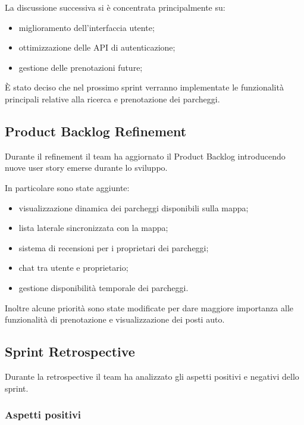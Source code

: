 \documentclass[12pt,a4paper]{article}
\begin{document}
La discussione successiva si è concentrata principalmente su:

\begin{itemize}
    \item miglioramento dell'interfaccia utente;
    \item ottimizzazione delle API di autenticazione;
    \item gestione delle prenotazioni future;
\end{itemize}

È stato deciso che nel prossimo sprint verranno implementate le funzionalità principali relative alla ricerca e prenotazione dei parcheggi.

\subsection{Product Backlog Refinement}

Durante il refinement il team ha aggiornato il Product Backlog introducendo nuove user story emerse durante lo sviluppo.

In particolare sono state aggiunte:

\begin{itemize}
    \item visualizzazione dinamica dei parcheggi disponibili sulla mappa;
    \item lista laterale sincronizzata con la mappa;
    \item sistema di recensioni per i proprietari dei parcheggi;
    \item chat tra utente e proprietario;
    \item gestione disponibilità temporale dei parcheggi.
\end{itemize}

Inoltre alcune priorità sono state modificate per dare maggiore importanza alle funzionalità di prenotazione e visualizzazione dei posti auto.

\subsection{Sprint Retrospective}

Durante la retrospective il team ha analizzato gli aspetti positivi e negativi dello sprint.

\subsubsection{Aspetti positivi}
\end{document}
